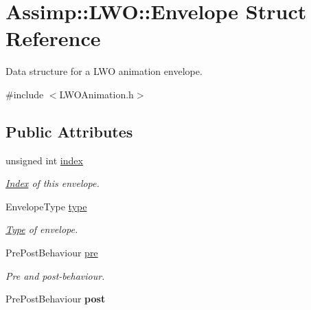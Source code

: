 \hypertarget{struct_assimp_1_1_l_w_o_1_1_envelope}{\section{Assimp\+:\+:L\+W\+O\+:\+:Envelope Struct Reference}
\label{struct_assimp_1_1_l_w_o_1_1_envelope}
}


Data structure for a L\+W\+O animation envelope.  




{\ttfamily \#include $<$L\+W\+O\+Animation.\+h$>$}

\subsection*{Public Attributes}
\begin{DoxyCompactItemize}
\item 
\hypertarget{struct_assimp_1_1_l_w_o_1_1_envelope_acac0268390040001f02541ba784d11ec}{unsigned int \hyperlink{struct_assimp_1_1_l_w_o_1_1_envelope_acac0268390040001f02541ba784d11ec}{index}}\label{struct_assimp_1_1_l_w_o_1_1_envelope_acac0268390040001f02541ba784d11ec}

\begin{DoxyCompactList}\small\item\em \hyperlink{struct_index}{Index} of this envelope. \end{DoxyCompactList}\item 
\hypertarget{struct_assimp_1_1_l_w_o_1_1_envelope_a6e8022e5f4532963734b7da94f103ad4}{Envelope\+Type \hyperlink{struct_assimp_1_1_l_w_o_1_1_envelope_a6e8022e5f4532963734b7da94f103ad4}{type}}\label{struct_assimp_1_1_l_w_o_1_1_envelope_a6e8022e5f4532963734b7da94f103ad4}

\begin{DoxyCompactList}\small\item\em \hyperlink{struct_type}{Type} of envelope. \end{DoxyCompactList}\item 
\hypertarget{struct_assimp_1_1_l_w_o_1_1_envelope_aa0f68cfaf9352b8e0abc41c281fec80d}{Pre\+Post\+Behaviour \hyperlink{struct_assimp_1_1_l_w_o_1_1_envelope_aa0f68cfaf9352b8e0abc41c281fec80d}{pre}}\label{struct_assimp_1_1_l_w_o_1_1_envelope_aa0f68cfaf9352b8e0abc41c281fec80d}

\begin{DoxyCompactList}\small\item\em Pre and post-\/behaviour. \end{DoxyCompactList}\item 
\hypertarget{struct_assimp_1_1_l_w_o_1_1_envelope_ad0b7cab4736ce27a06015dc47011765f}{Pre\+Post\+Behaviour {\bfseries post}}\label{struct_assimp_1_1_l_w_o_1_1_envelope_ad0b7cab4736ce27a06015dc47011765f}


\end{DoxyCompactItemize}
